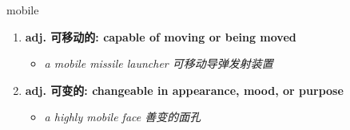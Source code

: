 
\begin{frame}
{\huge mobile}
\begin{center}
\begin{enumerate}\Large
  \item \textbf{adj. 可移动的: capable of moving or being moved}
  \begin{itemize}
    \item \em{\Large{a mobile missile launcher 可移动导弹发射装置}}
  \end{itemize}
  \item \textbf{adj. 可变的: changeable in appearance, mood, or purpose}
  \begin{itemize}
    \item \em{\Large{a highly mobile face 善变的面孔}}
  \end{itemize}
\end{enumerate}
\end{center}
\end{frame}
